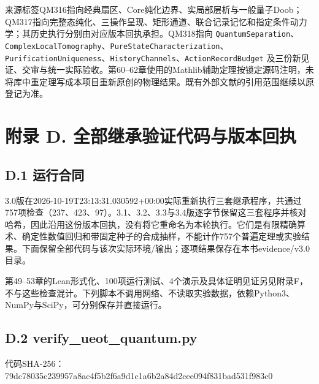 \documentclass[
  11pt,
  oneside]{book}
\begin{document}
来源标签QM316指向经典扇区、Core纯化边界、实局部层析与一般量子Doob；QM317指向完整态纯化、三操作呈现、矩形通道、联合记录记忆和指定条件动力学；其历史执行分别由对应版本回执承担。QM318指向
\texttt{QuantumSeparation}、\allowbreak \texttt{ComplexLocalTomography}、\allowbreak \texttt{PureStateCharacterization}、\allowbreak \texttt{PurificationUniqueness}、\allowbreak \texttt{HistoryChannels}、\allowbreak \texttt{ActionRecordBudget}
及三份新见证、交审与统一实际验收。第60--62章使用的Mathlib辅助定理按锁定源码注明，未将库中重定理写成本项目重新原创的物理结果。既有外部文献的引用范围继续以原登记为准。

\hypertarget{appendix-d}{%
\chapter{附录 D. 全部继承验证代码与版本回执}\label{appendix-d}}

\hypertarget{d.1-ux8fd0ux884cux5408ux540c}{%
\section{D.1 运行合同}\label{d.1-ux8fd0ux884cux5408ux540c}}

3.0版在2026-10-19T23:13:31.030592+00:00实际重新执行三套继承程序，共通过757项检查（237、423、97）。3.1、3.2、3.3与3.4版逐字节保留这三套程序并核对哈希，因此沿用这份版本回执，没有将它重命名为本轮执行。它们是有限精确算术、确定性数值回归和带固定种子的合成抽样，不能计作757个普遍定理或实验结果。下面保留全部代码与该次实际环境/输出；逐项结果保存在本书evidence/v3.0目录。

第49--53章的Lean形式化、100项运行测试、4个演示及具体证明见证另见附录F，不与这些检查混计。下列脚本不调用网络、不读取实验数据，依赖Python3、NumPy与SciPy，可分别保存并直接运行。

\hypertarget{d.2-verify_ueot_quantum.py}{%
\section{D.2
verify\_\allowbreak ueot\_\allowbreak quantum.py}\label{d.2-verify_ueot_quantum.py}}

代码SHA-256：79dc78035c239957a8ac4f5b2f6a9d1c1a6b2a84d2cee094f831bad531f983c0
\end{document}
